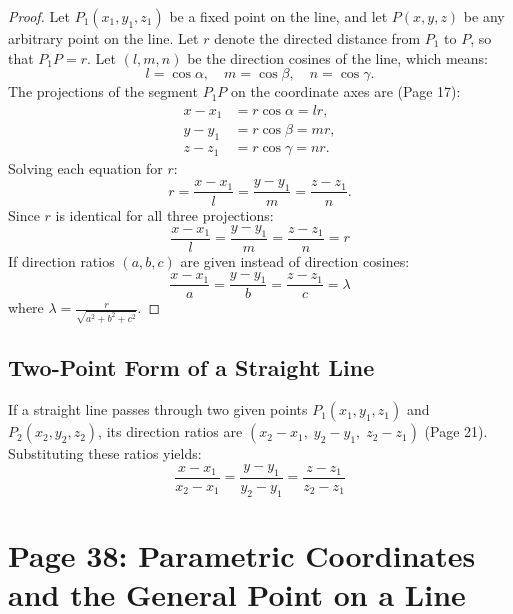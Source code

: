 \begin{proof}
Let $P_1(x_1, y_1, z_1)$ be a fixed point on the line, and let $P(x, y, z)$ be any arbitrary point on the line.
Let $r$ denote the directed distance from $P_1$ to $P$, so that $P_1 P = r$.
Let $(l, m, n)$ be the direction cosines of the line, which means:
\begin{equation}
    l = \cos\alpha, \quad m = \cos\beta, \quad n = \cos\gamma.
\end{equation}
The projections of the segment $P_1 P$ on the coordinate axes are (Page 17):
\begin{align}
    x - x_1 &= r\cos\alpha = lr, \\
    y - y_1 &= r\cos\beta = mr, \\
    z - z_1 &= r\cos\gamma = nr.
\end{align}
Solving each equation for $r$:
\begin{equation}
    r = \frac{x - x_1}{l} = \frac{y - y_1}{m} = \frac{z - z_1}{n}.
\end{equation}
Since $r$ is identical for all three projections:
\begin{equation}
    \boxed{\frac{x - x_1}{l} = \frac{y - y_1}{m} = \frac{z - z_1}{n} = r}
\end{equation}
If direction ratios $(a, b, c)$ are given instead of direction cosines:
\begin{equation}
    \boxed{\frac{x - x_1}{a} = \frac{y - y_1}{b} = \frac{z - z_1}{c} = \lambda}
\end{equation}
where $\lambda = \frac{r}{\sqrt{a^2+b^2+c^2}}$.
\end{proof}

\subsection{Two-Point Form of a Straight Line}
If a straight line passes through two given points $P_1(x_1, y_1, z_1)$ and $P_2(x_2, y_2, z_2)$, its direction ratios are $(x_2 - x_1, \; y_2 - y_1, \; z_2 - z_1)$ (Page 21). Substituting these ratios yields:
\begin{equation}
    \boxed{\frac{x - x_1}{x_2 - x_1} = \frac{y - y_1}{y_2 - y_1} = \frac{z - z_1}{z_2 - z_1}}
\end{equation}

\section{Page 38: Parametric Coordinates and the General Point on a Line}
\label{sec:page38}

